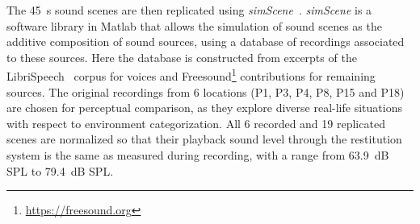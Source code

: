 \documentclass[11pt,a4paper]{article}
\begin{document}
The 45~s sound scenes are then replicated using \textit{simScene}~\cite{rossignol2015}. \textit{simScene} is a software library in Matlab that allows the simulation of sound scenes as the additive composition of sound sources, using a database of recordings associated to these sources. Here the database is constructed from excerpts of the LibriSpeech~\cite{panayotov2015} corpus for voices and Freesound\footnote{\url{https://freesound.org}} contributions for remaining sources. The original recordings from 6 locations (P1, P3, P4, P8, P15 and P18) are chosen for perceptual comparison, as they explore diverse real-life situations with respect to environment categorization. All 6 recorded and 19 replicated scenes are normalized so that their playback sound level through the restitution system is the same as measured during recording, with a range from 63.9~dB SPL to 79.4~dB SPL.
\end{document}
